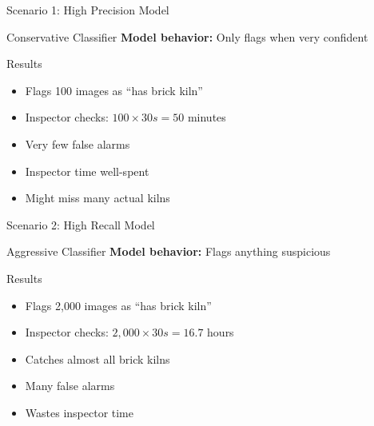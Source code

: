 \documentclass{beamer}
\begin{document}
\begin{frame}{Scenario 1: High Precision Model}
\begin{examplebox}{Conservative Classifier}
\textbf{Model behavior:} Only flags when very confident
\end{examplebox}

\vspace{0.3cm}

\begin{block}{Results}
\begin{itemize}
    \item Flags 100 images as ``has brick kiln''
    \item Inspector checks: $100 \times 30s = 50$ minutes
\end{itemize}
\end{block}

\vspace{0.3cm}

\begin{itemize}
    \item[\textcolor{green}{\checkmark}] Very few false alarms
    \item[\textcolor{green}{\checkmark}] Inspector time well-spent
    \item[\textcolor{red}{\times}] Might miss many actual kilns
\end{itemize}
\end{frame}

\begin{frame}{Scenario 2: High Recall Model}
\begin{examplebox}{Aggressive Classifier}
\textbf{Model behavior:} Flags anything suspicious
\end{examplebox}

\vspace{0.3cm}

\begin{block}{Results}
\begin{itemize}
    \item Flags 2,000 images as ``has brick kiln''
    \item Inspector checks: $2{,}000 \times 30s = 16.7$ hours
\end{itemize}
\end{block}

\vspace{0.3cm}

\begin{itemize}
    \item[\textcolor{green}{\checkmark}] Catches almost all brick kilns
    \item[\textcolor{red}{\times}] Many false alarms
    \item[\textcolor{red}{\times}] Wastes inspector time
\end{itemize}
\end{frame}
\end{document}
